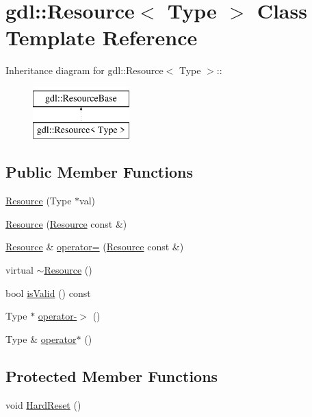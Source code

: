 \hypertarget{classgdl_1_1Resource}{
\section{gdl::Resource$<$ Type $>$ Class Template Reference}
\label{classgdl_1_1Resource}
}
Inheritance diagram for gdl::Resource$<$ Type $>$::\begin{figure}[H]
\begin{center}
\leavevmode
\includegraphics[height=2cm]{classgdl_1_1Resource}
\end{center}
\end{figure}
\subsection*{Public Member Functions}
\begin{DoxyCompactItemize}
\item 
\hyperlink{classgdl_1_1Resource_a149a477edeec7571d7664ac6be21f3ce}{Resource} (Type $\ast$val)
\item 
\hyperlink{classgdl_1_1Resource_a2110d7edf4e2864a70688a4279480e43}{Resource} (\hyperlink{classgdl_1_1Resource}{Resource} const \&)
\item 
\hyperlink{classgdl_1_1Resource}{Resource} \& \hyperlink{classgdl_1_1Resource_a8d4f9966f9a8047d0830fc0ce4c15d37}{operator=} (\hyperlink{classgdl_1_1Resource}{Resource} const \&)
\item 
virtual \hyperlink{classgdl_1_1Resource_a52f5853b3028356acb3cfe8673fa4bd3}{$\sim$Resource} ()
\item 
bool \hyperlink{classgdl_1_1Resource_a3d8b62b778b5c598ee51a5edcdae05ef}{isValid} () const 
\item 
Type $\ast$ \hyperlink{classgdl_1_1Resource_a0b869a1e27677c66bb78dec379e73658}{operator-\/$>$} ()
\item 
Type \& \hyperlink{classgdl_1_1Resource_a750113d7aafe245fecb39089d15ebbe3}{operator$\ast$} ()
\end{DoxyCompactItemize}
\subsection*{Protected Member Functions}
\begin{DoxyCompactItemize}
\item 
void \hyperlink{classgdl_1_1Resource_a62cfa0d7b8f63c2d6be09a644e49028c}{HardReset} ()
\end{DoxyCompactItemize}
